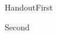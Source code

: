 \documentclass[handout]{beamer}
\begin{document}
\begin{frame}{Handout}First\pause\par Second\end{frame}
\end{document}
